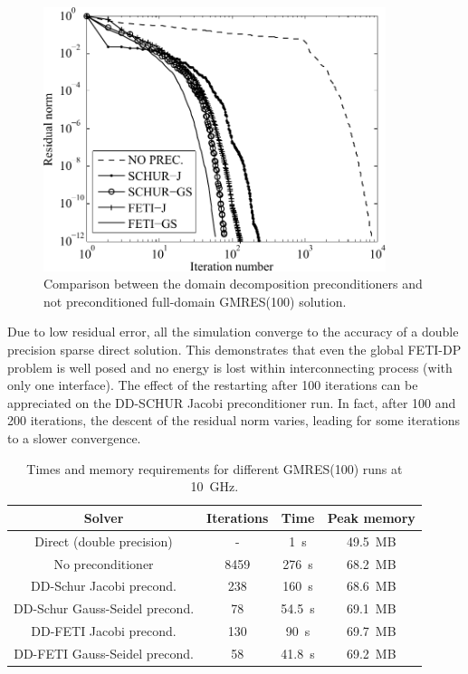 \begin{figure}[h!]
\centering
\includegraphics[width=10cm]{GMREScomp}
\caption{Comparison between the domain decomposition preconditioners and not preconditioned full-domain GMRES(100) solution.}
\label{fig:GMREScomp}
\end{figure}

Due to low residual error, all the simulation converge to the accuracy of a double precision sparse direct solution. This demonstrates that even the global FETI-DP problem is well posed and no energy is lost within interconnecting process (with only one interface). The effect of the restarting after 100 iterations can be appreciated on the DD-SCHUR Jacobi preconditioner run. In fact, after 100 and 200 iterations, the descent of the residual norm varies, leading for some iterations to a slower convergence.

\begin{table}[h!]
\begin{center}
\begin{tabular}{|c|c|c|c|}
\hline 
Solver & Iterations & Time & Peak memory \\ 
\hline
\hline 
Direct (double precision) & - & 1~s & 49.5~MB\\ \hline 
No preconditioner & 8459 & 276~s & 68.2~MB\\ \hline 
DD-Schur Jacobi precond. & 238 & 160~s & 68.6~MB\\ \hline 
DD-Schur Gauss-Seidel precond. & 78 & 54.5~s & 69.1~MB\\ \hline 
DD-FETI Jacobi precond. & 130 & 90~s & 69.7~MB\\ \hline 
DD-FETI Gauss-Seidel precond. & 58 & 41.8~s & 69.2~MB\\ \hline 
\end{tabular}
\end{center}
\caption{Times and memory requirements for different GMRES(100) runs at 10~GHz.}
\label{tab:gmresComp}
\end{table}


